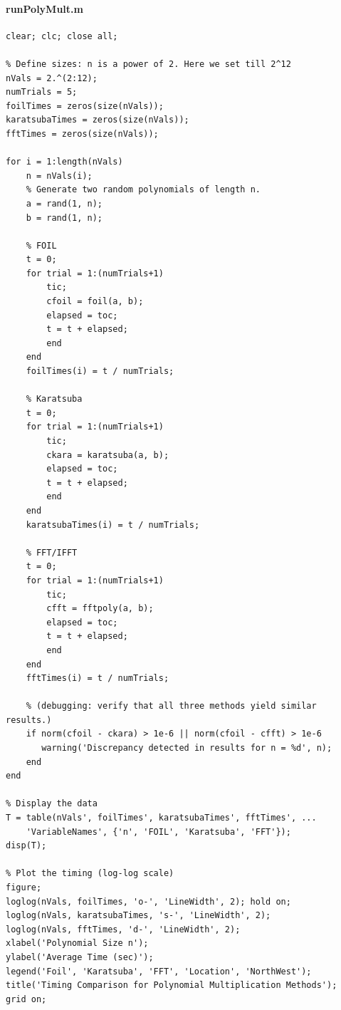 \documentclass[lang=cn,11pt]{elegantbook}
\begin{document}
\paragraph*{runPolyMult.m}
\begin{lstlisting}
clear; clc; close all;

% Define sizes: n is a power of 2. Here we set till 2^12
nVals = 2.^(2:12);
numTrials = 5; 
foilTimes = zeros(size(nVals));
karatsubaTimes = zeros(size(nVals));
fftTimes = zeros(size(nVals));

for i = 1:length(nVals)
    n = nVals(i);
    % Generate two random polynomials of length n.
    a = rand(1, n);
    b = rand(1, n);
    
    % FOIL
    t = 0;
    for trial = 1:(numTrials+1)
        tic;
        cfoil = foil(a, b);
        elapsed = toc;
        t = t + elapsed;
        end
    end
    foilTimes(i) = t / numTrials;
    
    % Karatsuba
    t = 0;
    for trial = 1:(numTrials+1)
        tic;
        ckara = karatsuba(a, b);
        elapsed = toc;
        t = t + elapsed;
        end
    end
    karatsubaTimes(i) = t / numTrials;
    
    % FFT/IFFT
    t = 0;
    for trial = 1:(numTrials+1)
        tic;
        cfft = fftpoly(a, b);
        elapsed = toc;
        t = t + elapsed;
        end
    end
    fftTimes(i) = t / numTrials;
    
    % (debugging: verify that all three methods yield similar results.)
    if norm(cfoil - ckara) > 1e-6 || norm(cfoil - cfft) > 1e-6
       warning('Discrepancy detected in results for n = %d', n);
    end
end

% Display the data
T = table(nVals', foilTimes', karatsubaTimes', fftTimes', ...
    'VariableNames', {'n', 'FOIL', 'Karatsuba', 'FFT'});
disp(T);

% Plot the timing (log-log scale)
figure;
loglog(nVals, foilTimes, 'o-', 'LineWidth', 2); hold on;
loglog(nVals, karatsubaTimes, 's-', 'LineWidth', 2);
loglog(nVals, fftTimes, 'd-', 'LineWidth', 2);
xlabel('Polynomial Size n');
ylabel('Average Time (sec)');
legend('Foil', 'Karatsuba', 'FFT', 'Location', 'NorthWest');
title('Timing Comparison for Polynomial Multiplication Methods');
grid on;

\end{lstlisting}
\end{document}
